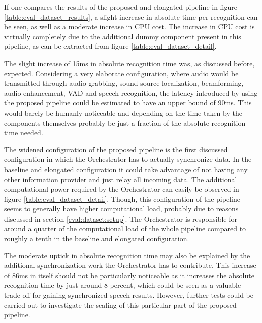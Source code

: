 
{ %
If one compares the results of the proposed and elongated pipeline in figure \ref{table:eval_dataset_results}, a slight increase in absolute time per recognition can be seen, as well as a moderate increase in CPU cost.
The increase in CPU cost is virtually completely due to the additional dummy component present in this pipeline, as can be extracted from figure \ref{table:eval_dataset_detail}. 

The slight increase of 15ms in absolute recognition time was, as discussed before, expected.
Considering a very elaborate configuration, where audio would be transmitted through audio grabbing, sound source localization, beamforming, audio enhancement, VAD and speech recognition, the latency introduced by using the proposed pipeline could be estimated to have an upper bound of 90ms.
This would barely be humanly noticeable and depending on the time taken by the components themselves probably be just a fraction of the absolute recognition time needed.
}

{ %
The widened configuration of the proposed pipeline is the first discussed configuration in which the Orchestrator has to actually synchronize data. 
In the baseline and elongated configuration it could take advantage of not having any other information provider and just relay all incoming data.
The additional computational power required by the Orchestrator can easily be observed in figure \ref{table:eval_dataset_detail}.
Though, this configuration of the pipeline seems to generally have higher computational load, probably due to reasons discussed in section \ref{eval:dataset:setup}.
The Orchestrator is responsible for around a quarter of the computational load of the whole pipeline compared to roughly a tenth in the baseline and elongated configuration.

The moderate uptick in absolute recognition time may also be explained by the additional synchronization work the Orchestrator has to contribute. 
This increase of 86ms in itself should not be particularly noticeable as it increases the absolute recognition time by just around 8 percent, which could be seen as a valuable trade-off for gaining synchronized speech results. 
However, further tests could be carried out to investigate the scaling of this particular part of the proposed pipeline.
}

